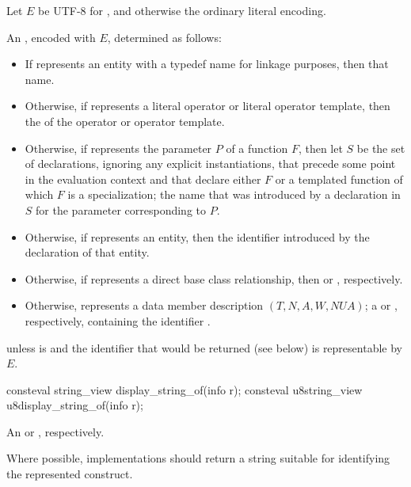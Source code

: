 \begin{itemdescr}
\pnum
Let $E$ be UTF-8 for ,
and otherwise the ordinary literal encoding.

\pnum
\returns
An \ntmbs{}, encoded with $E$,
determined as follows:
\begin{itemize}
\item
  If  represents an entity with a typedef name for linkage purposes,
  then that name.
\item
  Otherwise, if  represents a literal operator or literal operator template,
  then the  of the operator or operator template.
\item
  Otherwise, if  represents the parameter $P$ of a function $F$,
  then let $S$ be the set of declarations,
  ignoring any explicit instantiations,
  that precede some point in the evaluation context
  and that declare either $F$
  or a templated function of which $F$ is a specialization;
  the name that was introduced by a declaration in $S$
  for the parameter corresponding to $P$.
\item
  Otherwise, if  represents an entity,
  then the identifier introduced by the declaration of that entity.
\item
  Otherwise, if  represents a direct base class relationship,
  then  or ,
  respectively.
\item
  Otherwise,  represents a data member description
  $(T, N, A, W, NUA)$;
  a  or , respectively,
  containing the identifier .
\end{itemize}

\pnum
\throws
{} unless
 is 
and the identifier that would be returned (see below)
is representable by $E$.
\end{itemdescr}

%
%
\begin{itemdecl}
consteval string_view display_string_of(info r);
consteval u8string_view u8display_string_of(info r);
\end{itemdecl}

\begin{itemdescr}
\pnum
\returns
An
 or , respectively.

\pnum
\recommended
Where possible,
implementations should return a string
suitable for identifying the represented construct.
\end{itemdescr}

